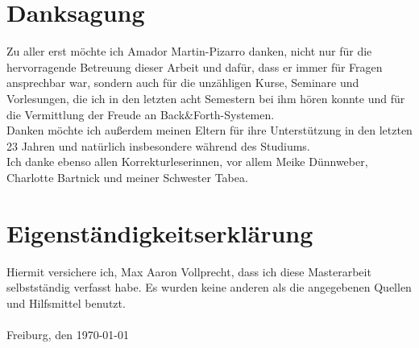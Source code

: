 \chapter*{Danksagung}
Zu aller erst möchte ich Amador Martin-Pizarro danken, nicht nur für die hervorragende Betreuung dieser Arbeit und dafür, dass er immer für Fragen ansprechbar war, sondern auch für die unzähligen Kurse, Seminare und Vorlesungen, die ich in den letzten acht Semestern bei ihm hören konnte und für die Vermittlung der Freude an Back\&Forth-Systemen.\\
Danken möchte ich außerdem meinen Eltern für ihre Unterstützung in den letzten 23 Jahren und natürlich insbesondere während des Studiums.\\
Ich danke ebenso allen Korrekturleserinnen, vor allem Meike Dünnweber, Charlotte Bartnick und meiner Schwester Tabea.
\chapter*{Eigenständigkeitserklärung}
\vspace{0.8cm}
Hiermit versichere ich, Max Aaron Vollprecht, dass ich diese Masterarbeit selbstständig verfasst habe. Es wurden keine anderen als die angegebenen Quellen und Hilfsmittel benutzt.
\\ \\
Freiburg, den \today

\newpage
\thispagestyle{empty}
\mbox{}
\newpage

